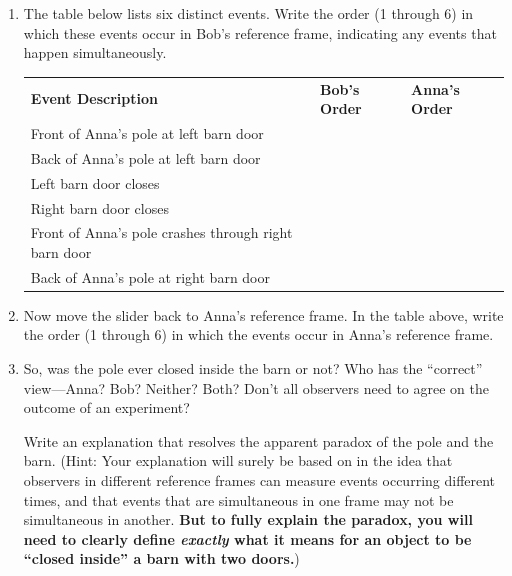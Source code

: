 \begin{enumerate}
\item The table below lists six distinct events.  Write the order (1 through 6) in which these events occur in Bob's reference frame, indicating any events that happen simultaneously.  

\begin{center}
{\renewcommand{\arraystretch}{1.8}
\begin{tabular}{|l|C{1.0in}|C{1.0in}|} \hline 
\textbf{Event Description} & \textbf{Bob's Order} & \textbf{Anna's Order} \\ 
\hhline{|=|=|=|}
Front of Anna's pole at left barn door & & \\ \hline 
Back of Anna's pole at left barn door & & \\ \hline 
Left barn door closes & & \\ \hline 
Right barn door closes & & \\ \hline 
Front of Anna's pole crashes through right barn door & & \\ \hline 
Back of Anna's pole at right barn door & & \\ \hline 
\end{tabular} }
\end{center}

\item Now move the slider back to Anna's reference frame. In the table above, write the order (1 through 6) in which the events occur in Anna's reference frame.  

\item So, was the pole ever closed inside the barn or not? Who has the ``correct'' view---Anna? Bob? Neither? Both?  Don't all observers need to agree on the outcome of an experiment?  
\medskip

Write an explanation that resolves the apparent paradox of the pole and the barn. 
(Hint: Your explanation will surely be based on in the idea that observers in different reference frames can measure events occurring different times, and that events that are simultaneous in one frame may not be simultaneous in another.  
\textbf{But to fully explain the paradox, you will need to clearly define \textit{exactly} what it means for an object to be ``closed inside'' a barn with two doors.})
\answerspace{1.5in}

\end{enumerate}


